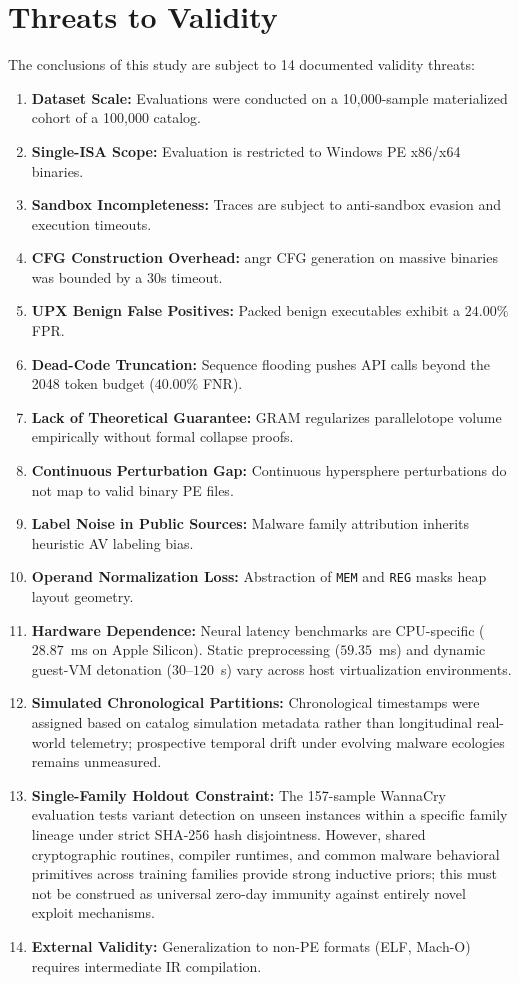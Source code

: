 \documentclass[pdflatex,sn-mathphys-num]{sn-jnl}
\begin{document}
\section{Threats to Validity}\label{sec:validity}
The conclusions of this study are subject to 14 documented validity threats:
\begin{enumerate}
    \item \textbf{Dataset Scale:} Evaluations were conducted on a 10,000-sample materialized cohort of a 100,000 catalog.
    \item \textbf{Single-ISA Scope:} Evaluation is restricted to Windows PE x86/x64 binaries.
    \item \textbf{Sandbox Incompleteness:} Traces are subject to anti-sandbox evasion and execution timeouts.
    \item \textbf{CFG Construction Overhead:} angr CFG generation on massive binaries was bounded by a 30s timeout.
    \item \textbf{UPX Benign False Positives:} Packed benign executables exhibit a $24.00\%$ FPR.
    \item \textbf{Dead-Code Truncation:} Sequence flooding pushes API calls beyond the 2048 token budget ($40.00\%$ FNR).
    \item \textbf{Lack of Theoretical Guarantee:} GRAM regularizes parallelotope volume empirically without formal collapse proofs.
    \item \textbf{Continuous Perturbation Gap:} Continuous hypersphere perturbations do not map to valid binary PE files.
    \item \textbf{Label Noise in Public Sources:} Malware family attribution inherits heuristic AV labeling bias.
    \item \textbf{Operand Normalization Loss:} Abstraction of \texttt{MEM} and \texttt{REG} masks heap layout geometry.
    \item \textbf{Hardware Dependence:} Neural latency benchmarks are CPU-specific ($28.87$~ms on Apple Silicon). Static preprocessing ($59.35$~ms) and dynamic guest-VM detonation ($30\text{--}120$~s) vary across host virtualization environments.
    \item \textbf{Simulated Chronological Partitions:} Chronological timestamps were assigned based on catalog simulation metadata rather than longitudinal real-world telemetry; prospective temporal drift under evolving malware ecologies remains unmeasured.
    \item \textbf{Single-Family Holdout Constraint:} The 157-sample WannaCry evaluation tests variant detection on unseen instances within a specific family lineage under strict SHA-256 hash disjointness. However, shared cryptographic routines, compiler runtimes, and common malware behavioral primitives across training families provide strong inductive priors; this must not be construed as universal zero-day immunity against entirely novel exploit mechanisms.
    \item \textbf{External Validity:} Generalization to non-PE formats (ELF, Mach-O) requires intermediate IR compilation.
\end{enumerate}
\end{document}
